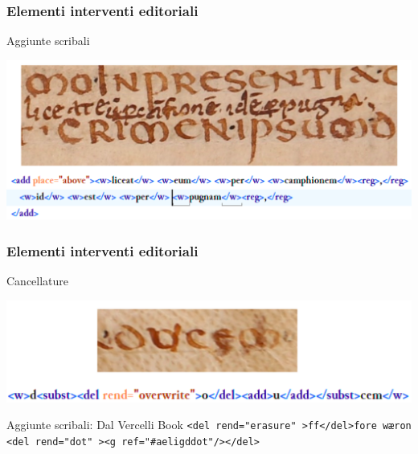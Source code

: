 \begin{frame}
    \frametitle{Elementi interventi editoriali}
    \addtocounter{nframe}{1}
    
   
    \begin{block}{Aggiunte scribali}
        \begin{center}
            \includegraphics[width=.9\textwidth]{imgs/Aggiunte-2.png}
        \end{center}

    \end{block}
    
\end{frame} 

\begin{frame}
    \frametitle{Elementi interventi editoriali}
    \addtocounter{nframe}{1}
    
    \begin{block}{Cancellature}
        \begin{center}
            \includegraphics[width=.9\textwidth]{imgs/Cancellature.png}
        \end{center}
    \end{block}
   
    \begin{block}{Aggiunte scribali: Dal Vercelli Book}
        \texttt{<del rend="erasure" >ff</del>fore wæron
        <del rend="dot" ><g ref="\#aeligddot"/></del>}
    \end{block}
    
\end{frame} 


